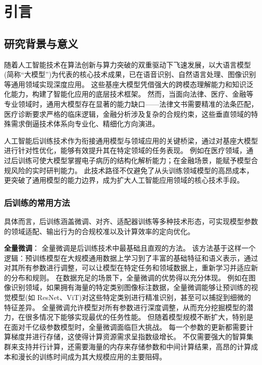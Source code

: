 \chapter{引言}

\section{研究背景与意义}
随着人工智能技术在算法创新与算力突破的双重驱动下飞速发展，以大语言模型(简称“大模型”)为代表的核心技术成果，已在语音识别、自然语言处理、图像识别等通用领域实现深度应用。
这些基座大模型凭借强大的跨模态理解能力和知识泛化能力，构建了智能化应用的底层技术框架。
然而，当面向法律、医疗、金融等专业领域时，通用大模型存在显著的能力缺口——法律文书需要精准的法条匹配，医疗诊断要求严格的临床逻辑，金融分析涉及复杂的合规约束，这些垂直领域的特殊需求倒逼技术体系向专业化、精细化方向演进。

人工智能后训练技术作为衔接通用模型与领域应用的关键桥梁，通过对基座大模型进行针对性优化，能够有效提升其在特定领域的任务表现。
例如在医疗领域，通过后训练可使大模型掌握电子病历的结构化解析能力；在金融场景，能赋予模型合规风险的实时研判能力。
此技术路径不仅避免了从头训练领域模型的高昂成本，更突破了通用模型的能力边界，成为扩大人工智能应用领域的核心技术手段。

\subsection{后训练的常用方法}
具体而言，后训练涵盖微调、对齐、适配器训练等多种技术形态，可实现模型参数的领域适配、输出行为的合规校准以及计算效率的定向优化。

\textbf{全量微调}：
全量微调是后训练技术中最基础且直观的方法。
该方法基于这样一个逻辑：预训练模型在大规模通用数据上学习到了丰富的基础特征和语义表示，通过对其所有参数进行调整，可以让模型在特定任务和领域数据上，重新学习并适应新的分布和规则。
在数据充足的场景下，全量微调的优势得以充分体现。
例如在图像识别领域，如果拥有海量的特定类别图像标注数据，全量微调能够让预训练的视觉模型(如 ResNet、ViT)对这些特定类别进行精准识别，甚至可以捕捉到细微的特征差异。
全量微调允许模型对所有参数进行深度调整，从而充分挖掘模型的潜力，在很多情况下能够实现最优的任务性能。
但随着模型规模不断扩大，特别是在面对千亿级参数模型时，全量微调面临巨大挑战。
每一个参数的更新都需要计算梯度并进行存储，这使得计算资源需求呈指数级增长。
不仅需要强大的智算集群来支持并行计算，还需要海量的内存来存储参数和中间计算结果，高昂的计算成本和漫长的训练时间成为其大规模应用的主要阻碍。


